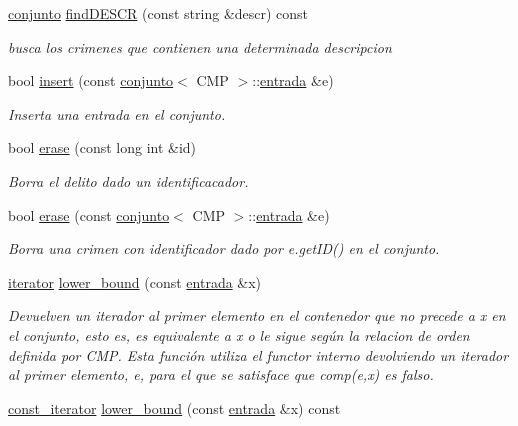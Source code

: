 \begin{DoxyCompactItemize}
\hyperlink{classconjunto}{conjunto} \hyperlink{classconjunto_ab4f2fdce330e5b53c3ac8f529ccd435d}{find\-D\-E\-S\-C\-R} (const string \&descr) const 
\begin{DoxyCompactList}\small\item\em busca los crimenes que contienen una determinada descripcion \end{DoxyCompactList}\item 
bool \hyperlink{classconjunto_a61c22092268cc91439b93a2fd96e4173}{insert} (const \hyperlink{classconjunto}{conjunto}$<$ C\-M\-P $>$\-::\hyperlink{classconjunto_a7630ace7cb17bcec07daf5804f1a0780}{entrada} \&e)
\begin{DoxyCompactList}\small\item\em Inserta una entrada en el conjunto. \end{DoxyCompactList}\item 
bool \hyperlink{classconjunto_a92332298c1202e92027b48f01c69ae91}{erase} (const long int \&id)
\begin{DoxyCompactList}\small\item\em Borra el delito dado un identificacador. \end{DoxyCompactList}\item 
bool \hyperlink{classconjunto_a4d137b4ba9c3248129c0b49e42a42718}{erase} (const \hyperlink{classconjunto}{conjunto}$<$ C\-M\-P $>$\-::\hyperlink{classconjunto_a7630ace7cb17bcec07daf5804f1a0780}{entrada} \&e)
\begin{DoxyCompactList}\small\item\em Borra una crimen con identificador dado por e.\-get\-I\-D() en el conjunto. \end{DoxyCompactList}\item 
\hyperlink{classconjunto_1_1iterator}{iterator} \hyperlink{classconjunto_a06d4fc273484caba58361331ef58648e}{lower\-\_\-bound} (const \hyperlink{classconjunto_a7630ace7cb17bcec07daf5804f1a0780}{entrada} \&x)
\begin{DoxyCompactList}\small\item\em Devuelven un iterador al primer elemento en el contenedor que no precede a x en el conjunto, esto es, es equivalente a x o le sigue según la relacion de orden definida por C\-M\-P. Esta función utiliza el functor interno devolviendo un iterador al primer elemento, e, para el que se satisface que comp(e,x) es falso. \end{DoxyCompactList}\item 
\hyperlink{classconjunto_1_1const__iterator}{const\-\_\-iterator} \hyperlink{classconjunto_af8996698d6bb05f0c0087ffcc7430e27}{lower\-\_\-bound} (const \hyperlink{classconjunto_a7630ace7cb17bcec07daf5804f1a0780}{entrada} \&x) const 

\end{DoxyCompactItemize}
